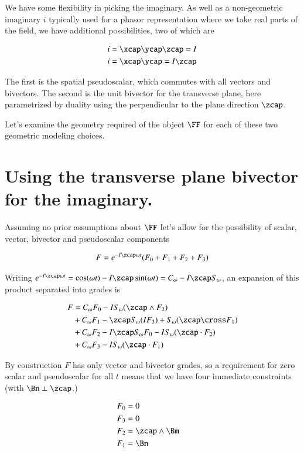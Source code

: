 We have some flexibility in picking the imaginary.  As well as a non-geometric imaginary $i$ typically used for a phasor representation where we take real parts of the field, we have additional possibilities, two of which are

\begin{align}\label{eqn:radiationGeometry:foo4}
i &= \xcap\ycap\zcap = I \\
i &= \xcap \ycap = I \zcap
\end{align}

The first is the spatial pseudoscalar, which commutes with all vectors and bivectors.  The second is the unit bivector for the transverse plane, here parametrized by duality using the perpendicular to the plane direction $\zcap$.

Let's examine the geometry required of the object $\FF$ for each of these two geometric modeling choices.

\section{Using the transverse plane bivector for the imaginary.}

Assuming no prior assumptions about $\FF$ let's allow for the possibility of scalar, vector, bivector and pseudoscalar components 

\begin{align}\label{eqn:radiationGeometry:foo5}
F = e^{-I\zcap \omega t} ( F_0 + F_1 + F_2 + F_3 )
\end{align}

Writing $e^{-I\zcap \omega t} = \cos(\omega t) -I \zcap \sin(\omega t) = C_\omega -I \zcap S_\omega$, an expansion of this product separated into grades is

\begin{align*}
F &= 
  C_\omega F_0 - I S_\omega (\zcap \wedge F_2) \\
&+ C_\omega F_1 - \zcap S_\omega (I F_3) + S_\omega (\zcap \cross F_1)  \\
&+ C_\omega F_2 - I \zcap S_\omega F_0 - I S_\omega (\zcap \cdot F_2) \\
&+ C_\omega F_3 - I S_\omega (\zcap \cdot F_1)
\end{align*}

By construction $F$ has only vector and bivector grades, so a requirement for zero scalar and pseudoscalar for all $t$ means that we have four immediate constraints (with $\Bn \perp \zcap$.)

\begin{align*}
F_0 &= 0 & \\
F_3 &= 0 & \\
F_2 &= \zcap \wedge \Bm \\
F_1 &= \Bn 
\end{align*}

